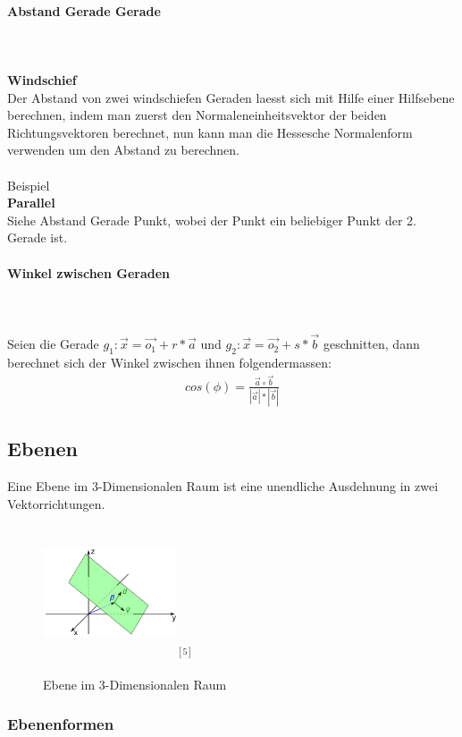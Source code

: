 \documentclass[a4paper]{article} %
\begin{document}
	\paragraph{Abstand Gerade Gerade}
	\hspace{0 cm} \\ \noindent \\
	\textbf{Windschief\\}
	Der Abstand von zwei windschiefen Geraden laesst sich mit Hilfe einer Hilfsebene berechnen, indem man zuerst den Normaleneinheitsvektor der beiden Richtungsvektoren berechnet, nun kann man die Hessesche Normalenform verwenden um den Abstand zu berechnen.\\\\
	Beispiel\\
	\textbf{Parallel\\}
	Siehe Abstand Gerade Punkt, wobei der Punkt ein beliebiger Punkt der 2. Gerade ist.
	\paragraph{Winkel zwischen Geraden}
	\hspace{0 cm} \\ \noindent \\
	Seien die Gerade $g_1: \vec{x}= \vec{o_1}+r*\vec{a}$ und $ g_2: \vec{x}=\vec{o_2}+s*\vec{b} $  geschnitten, dann berechnet sich der Winkel zwischen ihnen folgendermassen:
	\begin{align*}
		cos(\phi)= \frac{\vec{a} \circ \vec{b}}{|\vec{a}|*|\vec{b}|}
	\end{align*}
	\subsection{Ebenen}
	Eine Ebene im 3-Dimensionalen Raum ist eine unendliche Ausdehnung in zwei Vektorrichtungen.
	\begin{figure}[H]
				\includegraphics[width=150px, height=150px]{Ebene.png}$^{[5]}$
					\captionsetup{labelformat=empty}
				\caption{Ebene im 3-Dimensionalen Raum}
	\end{figure}
	\subsubsection{Ebenenformen}
\end{document}
